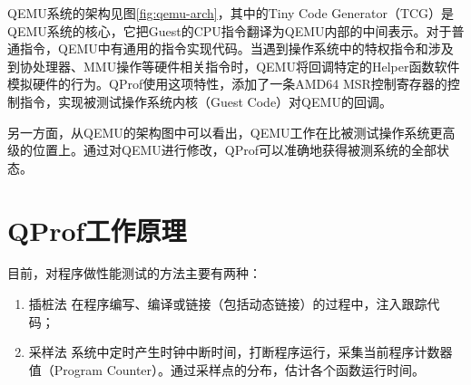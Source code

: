 QEMU系统的架构见图\ref{fig:qemu-arch}，其中的Tiny Code
Generator（TCG）是QEMU系统的核心，它把Guest的CPU指令翻译为QEMU内部的中间表示。对于普通指令，QEMU中有通用的指令实现代码。当遇到操作系统中的特权指令和涉及到协处理器、MMU操作等硬件相关指令时，QEMU将回调特定的Helper函数软件模拟硬件的行为。QProf使用这项特性，添加了一条AMD64
MSR控制寄存器的控制指令，实现被测试操作系统内核（Guest Code）对QEMU的回调。

另一方面，从QEMU的架构图中可以看出，QEMU工作在比被测试操作系统更高级的位置上。通过对QEMU进行修改，QProf可以准确地获得被测系统的全部状态。

\section{QProf工作原理}
	目前，对程序做性能测试的方法主要有两种：
	\begin{enumerate}
		\item {\heiti 插桩法}
			在程序编写、编译或链接（包括动态链接）的过程中，注入跟踪代码；
		\item {\heiti 采样法}
			系统中定时产生时钟中断时间，打断程序运行，采集当前程序计数器值（Program
			Counter）。通过采样点的分布，估计各个函数运行时间。
	\end{enumerate}

